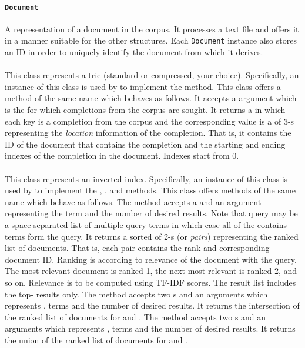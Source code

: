 \documentclass[addpoints]{exam}
\begin{document}
\paragraph{\texttt{Document}} A representation of a document in the corpus. It processes a text file and offers it in a manner suitable for the other structures. Each \texttt{Document} instance also stores an ID in order to uniquely identify the document from which it derives.

\paragraph{} This class represents a trie (standard or compressed, your choice). Specifically, an instance of this class is used by  to implement the  method. This class offers a method of the same name which behaves as follows. It accepts a  argument which is the  for which completions from the corpus are sought. It returns a  in which each key is a completion from the corpus and the corresponding value is a  of 3-s representing the \textit{location} information of the completion. That is, it contains the ID of the document that contains the completion and the starting and ending indexes of the completion in the document. Indexes start from 0.


\paragraph{} This class represents an inverted index. Specifically, an instance of this class is used by  to implement the , , and  methods. This class offers methods of the same name which behave as follows. The  method accepts a  and an  argument representing the  term and the number of desired results. Note that query may be a space separated list of multiple query terms in which case all of the contains terms form the query. It returns a sorted  of 2-s (or \textit{pairs}) representing the ranked list of documents. That is, each pair contains the rank and corresponding document ID. Ranking is according to relevance of the document with the query. The most relevant document is ranked 1, the next most relevant is ranked 2, and so on. Relevance is to be computed using TF-IDF scores. The result list includes the top- results only.
The  method accepts two s and an  arguments which represents ,  terms and the number of desired results. It returns the intersection of the ranked list of documents for  and . The  method accepts two s and an  arguments which represents ,  terms and the number of desired results. It returns the union of the ranked list of documents for  and .
\end{document}
